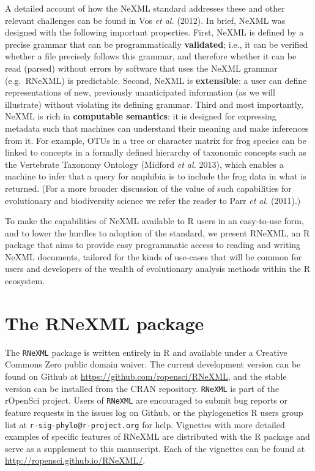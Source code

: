 \documentclass[author-year, review, 11pt]{components/elsarticle} %
\begin{document}
A detailed account of how the NeXML standard addresses these and other
relevant challenges can be found in Vos \emph{et al.} (2012). In brief,
NeXML was designed with the following important properties. First, NeXML
is defined by a precise grammar that can be programmatically
\textbf{validated}; i.e., it can be verified whether a file precisely
follows this grammar, and therefore whether it can be read (parsed)
without errors by software that uses the NeXML grammar (e.g.~RNeXML) is
predictable. Second, NeXML is \textbf{extensible}: a user can define
representations of new, previously unanticipated information (as we will
illustrate) without violating its defining grammar. Third and most
importantly, NeXML is rich in \textbf{computable semantics}: it is
designed for expressing metadata such that machines can understand their
meaning and make inferences from it. For example, OTUs in a tree or
character matrix for frog species can be linked to concepts in a
formally defined hierarchy of taxonomic concepts such as the Vertebrate
Taxonomy Ontology (Midford \emph{et al.} 2013), which enables a machine
to infer that a query for amphibia is to include the frog data in what
is returned. (For a more broader discussion of the value of such
capabilities for evolutionary and biodiversity science we refer the
reader to Parr \emph{et al.} (2011).)

To make the capabilities of NeXML available to R users in an easy-to-use
form, and to lower the hurdles to adoption of the standard, we present
RNeXML, an R package that aims to provide easy programmatic access to
reading and writing NeXML documents, tailored for the kinds of use-cases
that will be common for users and developers of the wealth of
evolutionary analysis methods within the R ecosystem.

\section{The RNeXML package}\label{the-rnexml-package}

The \texttt{RNeXML} package is written entirely in R and available under
a Creative Commons Zero public domain waiver. The current development
version can be found on Github at
\href{}{https://github.com/ropensci/RNeXML}, and the stable version can
be installed from the CRAN repository. \texttt{RNeXML} is part of the
rOpenSci project. Users of \texttt{RNeXML} are encouraged to submit bug
reports or feature requests in the issues log on Github, or the
phylogenetics R users group list at \texttt{r-sig-phylo@r-project.org}
for help. Vignettes with more detailed examples of specific features of
RNeXML are distributed with the R package and serve as a supplement to
this manuscript. Each of the vignettes can be found at
\href{}{http://ropensci.github.io/RNeXML/}.
\end{document}
